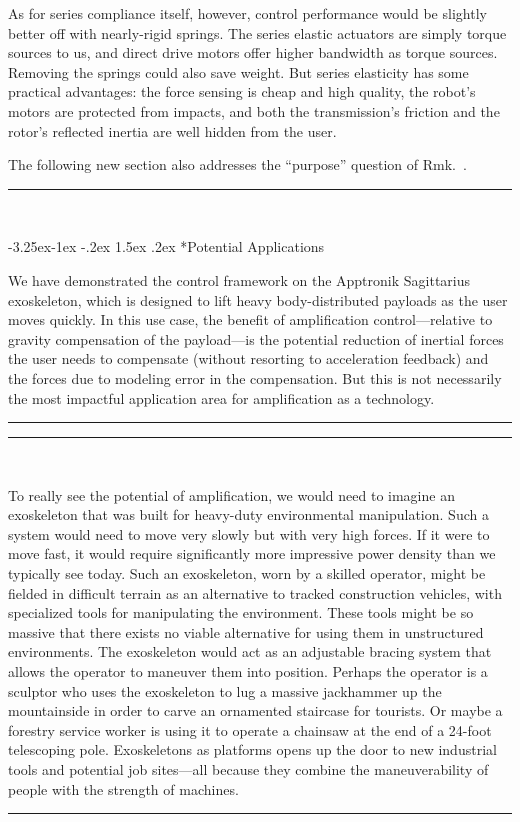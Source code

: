 \documentclass[10pt,letterpaper]{letter}
\makeatletter
\renewcommand*{\ref}[1]{\zref{#1}}
\newcommand*{\ta}[1]{\textcolor[HTML]{107f10}{#1}}
\newcounter{section}
\newcounter{subsection}[section]
\newcommand\subsection{\@startsection{subsection}{2}{\z@}%
	{-3.25ex\@plus -1ex \@minus -.2ex}%
	{1.5ex \@plus .2ex}%
	{\normalfont\large\bfseries}}
\newcommand{\paperquote}[1]{%
	\begin{center}
		
		\begin{minipage}{.8\textwidth}
			{\rule{\textwidth}{.5pt}}\vspace{.5em}\\
			\begin{minipage}{\textwidth}\setlength{\parindent}{2em}#1\end{minipage}
			\vspace{.5em}
			{\rule{\textwidth}{.5pt}}
		\end{minipage}%
	\end{center}
}
\makeatother
\begin{document}
\begin{letter}{}
{\ta{As for series compliance itself, however, control performance would be slightly better off with nearly-rigid springs.
	The series elastic actuators are simply torque sources to us, and direct drive motors offer higher bandwidth as torque sources.
	Removing the springs could also save weight.
	But series elasticity has some practical advantages: the force sensing is cheap and high quality, the robot's motors are protected from impacts, and both the transmission's friction and the rotor's reflected inertia are well hidden from the user.
}
}

The following new section also addresses the ``purpose'' question of Rmk.~\ref{rev2:purpose}.
\paperquote{
\subsection*{\ta{Potential Applications}}

\ta{
	We have demonstrated the control framework on the Apptronik Sagittarius exoskeleton, which is designed to lift heavy body-distributed payloads as the user moves quickly.
	In this use case, the benefit of amplification control---relative to gravity compensation of the payload---is the potential reduction of inertial forces the user needs to compensate (without resorting to acceleration feedback) and the forces due to modeling error in the compensation.
	But this is not necessarily the most impactful application area for amplification as a technology.}
}


\paperquote{
\ta{To really see the potential of amplification, we would need to imagine an exoskeleton that was built for heavy-duty environmental manipulation.
	Such a system would need to move very slowly but with very high forces.
	If it were to move fast, it would require significantly more impressive power density than we typically see today.
	Such an exoskeleton, worn by a skilled operator, might be fielded in difficult terrain as an alternative to tracked construction vehicles, with specialized tools for manipulating the environment.
	These tools might be so massive that there exists no viable alternative for using them in unstructured environments.
	The exoskeleton would act as an adjustable bracing system that allows the operator to maneuver them into position.
	Perhaps the operator is a sculptor who uses the exoskeleton to lug a massive jackhammer up the mountainside in order to carve an ornamented staircase for tourists.
	Or maybe a forestry service worker is using it to operate a chainsaw at the end of a 24-foot telescoping pole.
	Exoskeletons as platforms opens up the door to new industrial tools and potential job sites---all because they combine the maneuverability of people with the strength of machines.}
}


\end{letter}
\end{document}
